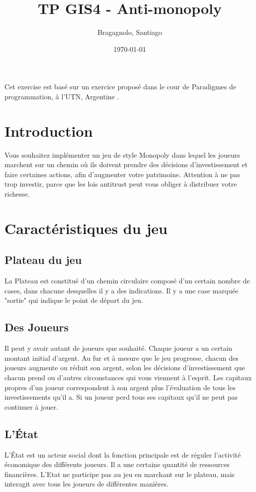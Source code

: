 \documentclass[12pt]{article}
\author{
        Bragagnolo, Santiago
}
\title{TP GIS4 - Anti-monopoly}
\date{\today}
\begin{document}
\maketitle
Cet exercise est basé sur un exercice proposé dans le cour de Paradigmes de programmation, à l'UTN, Argentine .

\section{Introduction}

Vous souhaitez implémenter un jeu de style Monopoly dans lequel les joueurs marchent sur un chemin où
ils doivent prendre des décisions d'investissement et faire certaines actions, afin d'augmenter votre
patrimoine. Attention à ne pas trop investir, parce que les lois antitrust peut vous obliger à
distribuer votre richesse.


\section{Caractéristiques du jeu}

    \subsection{Plateau du jeu}
    La Plateau est constitué d'un chemin circulaire composé d'un certain nombre de cases,
dans chacune desquelles il y a des indications. Il y a une case marquée "sortie" qui
indique le point de départ du jeu.

    \subsection{Des Joueurs}
    Il peut y avoir autant de joueurs que souhaité. Chaque joueur a un certain
montant initial d'argent. Au fur et à mesure que le jeu progresse, chacun des joueurs augmente
ou réduit son argent, selon les décisions d'investissement que chacun prend ou d'autres
circonstances qui vous viennent à l’esprit. Les capitaux propres d'un joueur correspondent à
son argent plus l'évaluation de tous les investissements qu'il a. Si un joueur perd tous ses capitaux qu'il ne peut pas continuer à jouer.

    
    \subsection{L'\'Etat}
    L'\'Etat est un acteur social dont la fonction principale est de réguler l'activité économique des
différents joueurs. Il a une certaine quantité de ressources financières.  L'Etat ne participe pas
au jeu en marchant sur le plateau, mais interagit avec tous les joueurs de différentes manières.
\end{document}
